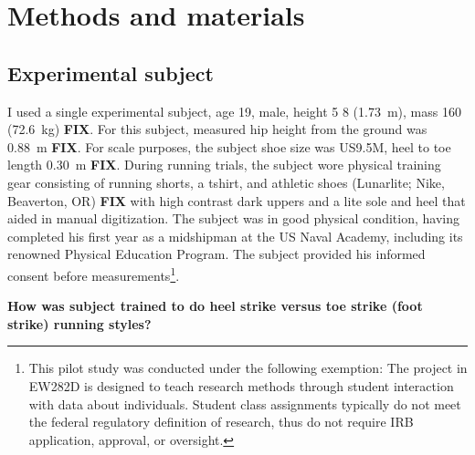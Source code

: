 \section{Methods and materials}
\label{sec:methods}

\subsection{Experimental subject}
I used a single experimental subject, age \SI{19}{\year}, male, height \SI{5}{\foot} \SI{8}{\inch} (\SI{1.73}{\meter}), mass \SI{160}{\pound} (\SI{72.6}{\kilo\gram}) \textbf{FIX}. For this subject, measured hip height from the ground was \SI{0.88}{\meter} \textbf{FIX}. For scale purposes, the subject shoe size was US9.5M, heel to toe length \SI{0.30}{\meter} \textbf{FIX}. During running trials, the subject wore physical training  gear consisting of running shorts, a tshirt, and athletic shoes (Lunarlite; Nike, Beaverton, OR) \textbf{FIX} with high contrast dark uppers and a lite sole and heel that aided in manual digitization. The subject was in good physical condition, having completed his first year as a midshipman at the US Naval Academy, including its renowned Physical Education Program. The subject provided his informed consent before measurements\footnote{This pilot study was conducted under the following exemption: The project in EW282D is designed to teach research methods through student interaction with data about individuals. Student class assignments typically do not meet the federal regulatory definition of research, thus do not require IRB application, approval, or oversight.}.  

\textbf{How was subject trained to do heel strike versus toe strike (foot strike) running styles?}



